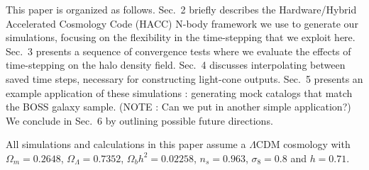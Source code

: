 This paper is organized as follows. Sec.~2 briefly describes the Hardware/Hybrid
Accelerated Cosmology Code (HACC) N-body framework we use to generate our
simulations, focusing on the flexibility in the time-stepping that we exploit here. 
Sec.~3 presents a sequence of convergence tests where we evaluate the effects
of time-stepping on the halo density field. Sec.~4 discusses interpolating between
saved time steps, necessary for constructing light-cone outputs. Sec.~5 presents
an example application of these simulations : generating mock catalogs that 
match the BOSS galaxy sample. (NOTE : Can we put in another simple application?) 
We conclude in Sec.~6 by outlining possible future directions.

All simulations and calculations in this paper assume a $\Lambda$CDM
cosmology with $\Omega_{m}=0.2648$, $\Omega_{\Lambda}=0.7352$, $\Omega_{b}h^{2}=0.02258$,
$n_{s}=0.963$, $\sigma_{8}=0.8$ and $h=0.71$.

